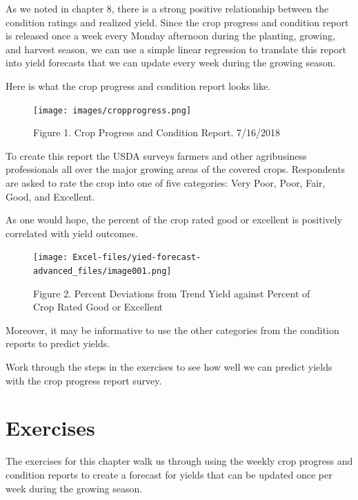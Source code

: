 \documentclass[
  letterpaper,
  DIV=11,
  numbers=noendperiod]{scrreprt}
\begin{document}
As we noted in chapter 8, there is a strong positive relationship
between the condition ratings and realized yield. Since the crop
progress and condition report is released once a week every Monday
afternoon during the planting, growing, and harvest season, we can use a
simple linear regression to translate this report into yield forecasts
that we can update every week during the growing season.

Here is what the crop progress and condition report looks like.

\begin{figure}[H]

{\centering \texttt{[image: images/cropprogress.png]}

}

\caption{Figure 1. Crop Progress and Condition Report. 7/16/2018}

\end{figure}%

To create this report the USDA surveys farmers and other agribusiness
professionals all over the major growing areas of the covered crops.
Respondents are asked to rate the crop into one of five categories: Very
Poor, Poor, Fair, Good, and Excellent.

As one would hope, the percent of the crop rated good or excellent is
positively correlated with yield outcomes.

\begin{figure}[H]

{\centering \texttt{[image: Excel-files/yied-forecast-advanced\_files/image001.png]}

}

\caption{Figure 2. Percent Deviations from Trend Yield against Percent
of Crop Rated Good or Excellent}

\end{figure}%

Moreover, it may be informative to use the other categories from the
condition reports to predict yields.

Work through the steps in the exercises to see how well we can predict
yields with the crop progress report survey.

\section{Exercises}\label{exercises-9}

The exercises for this chapter walk us through using the weekly crop
progress and condition reports to create a forecast for yields that can
be updated once per week during the growing season.
\end{document}

